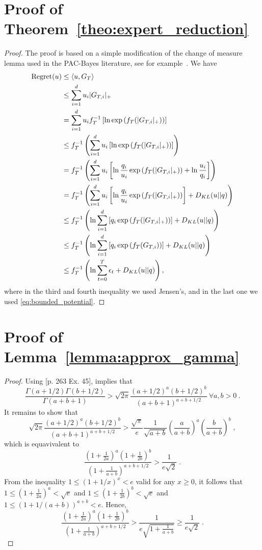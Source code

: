 \section{Proof of Theorem~\ref{theo:expert_reduction}}
\begin{proof}
The proof is based on a simple modification of the change of measure lemma used in the PAC-Bayes literature, see for example~\citet{McAllester13}.
We have
\begin{align*}
\operatorname{Regret}(u) 
& \leq \langle u, G_T \rangle \\
& \leq \sum_{i=1}^d u_i |G_{T,i}|_+ \\
& = \sum_{i=1}^d u_i f_T^{-1}\left[\ln \exp\left(f_T(|G_{T,i}|_+)\right)\right] \\
& \leq f_T^{-1}\left(\sum_{i=1}^d u_i \left[\ln \exp\left(f_T(|G_{T,i}|_+)\right)\right]\right) \\
& = f_T^{-1}\left(\sum_{i=1}^d u_i \left[\ln \frac{q_i}{u_i}\exp\left(f_T(|G_{T,i}|_+)\right)+ \ln\frac{u_i}{q_i}\right]\right) \\
& = f_T^{-1}\left(\sum_{i=1}^d u_i \left[\ln \frac{q_i}{u_i}\exp\left(f_T(|G_{T,i}|_+)\right)\right] + D_{KL}(u||q)\right) \\
& \leq f_T^{-1}\left(\ln \sum_{i=1}^d \left[q_i \exp\left(f_T(|G_{T,i}|_+)\right)\right] + D_{KL}(u||q)\right) \\
& \leq f_T^{-1}\left(\ln \sum_{i=1}^d \left[q_i \exp\left(f_T(G_{T,i})\right)\right] + D_{KL}(u||q)\right) \\
& \leq f_T^{-1}\left(\ln \sum_{t=0}^T \epsilon_t + D_{KL}(u||q)\right),
\end{align*}
where in the third and fourth inequality we used Jensen's, and in the last one
we used \eqref{eq:bounded_potential}.
\end{proof}

\section{Proof of Lemma~\ref{lemma:approx_gamma}}
\begin{proof}
Using \cite{WhittakerW27}[p. 263 Ex. 45], implies that
\[
\frac{\Gamma(a+1/2)\Gamma(b+1/2)}{\Gamma(a+b+1)} > \sqrt{2\pi} \frac{(a+1/2)^a (b+1/2)^b}{(a+b+1)^{a+b+1/2}} \ \forall a,b>0~.
\]
It remains to show that
$$
\sqrt{2\pi} \frac{(a+1/2)^a (b+1/2)^b}{(a+b+1)^{a+b+1/2}} > \frac{\sqrt{\pi}}{e} \frac{1}{\sqrt{a+b}} \left( \frac{a}{a+b} \right)^a \left( \frac{b}{a+b} \right)^b \; ,
$$
which is equavivalent to
$$
\frac{(1+\frac{1}{2a})^a (1+\frac{1}{2b})^b}{(1+\frac{1}{a+b})^{a+b+1/2}} > \frac{1}{e\sqrt{2}} \; .
$$
From the inequality $1 \le (1+1/x)^x < e$ valid for any $x \ge 0$, it follows
that $1 \le (1+\frac{1}{2a})^a < \sqrt{e}$ and $1 \le (1+\frac{1}{2b})^b < \sqrt{e}$
and $1 \le (1+1/(a+b))^{a+b} < e$. Hence,
$$
\frac{(1+\frac{1}{2a})^a (1+\frac{1}{2b})^b}{(1+\frac{1}{a+b})^{a+b+1/2}}
> \frac{1}{e \sqrt{1 + \frac{1}{a+b}}}
\ge \frac{1}{e \sqrt{2}} \; .
$$
\end{proof}

